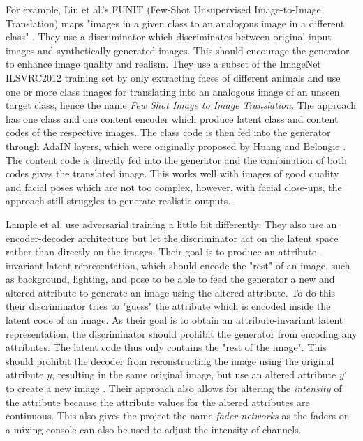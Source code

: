 \documentclass[conference]{IEEEtran}
\begin{document}
For example, Liu et al.'s FUNIT (Few-Shot Unsupervised Image-to-Image Translation) maps "images in a given class to an analogous image in a different class" \cite{liu2019few}. They use a discriminator which discriminates between original input images and synthetically generated images. This should encourage the generator to enhance image quality and realism. 
They use a subset of the ImageNet ILSVRC2012 training set by only extracting faces of different animals and use one or more class images for translating into an analogous image of an unseen target class, hence the name \textit{Few Shot Image to Image Translation}. The approach has one class and one content encoder which produce latent class and content codes of the respective images. The class code is then fed into the generator through AdaIN layers, which were originally proposed by Huang and Belongie \cite{huang2017arbitrary}. The content code is directly fed into the generator and the combination of both codes gives the translated image. This works well with images of good quality and facial poses which are not too complex, however, with facial close-ups, the approach still struggles to generate realistic outputs.

Lample et al. use adversarial training a little bit differently: They also use an encoder-decoder architecture but let the discriminator act on the latent space rather than directly on the images.
Their goal is to produce an attribute-invariant latent representation, which should encode the "rest" of an image, such as background, lighting, and pose to be able to feed the generator a new and altered attribute to generate an image using the altered attribute.
To do this their discriminator tries to "guess" the attribute which is encoded inside the latent code of an image. As their goal is to obtain an attribute-invariant latent representation, the discriminator should prohibit the generator from encoding any attributes. The latent code thus only contains the "rest of the image". This should prohibit the decoder from reconstructing the image using the original attribute $y$, resulting in the same original image, but use an altered attribute $y'$ to create a new image \cite{lample2017fader}.
Their approach also allows for altering the \textit{intensity} of the attribute because the attribute values for the altered attributes are continuous. This also gives the project the name \textit{fader networks} as the faders on a mixing console can also be used to adjust the intensity of channels.
\end{document}
